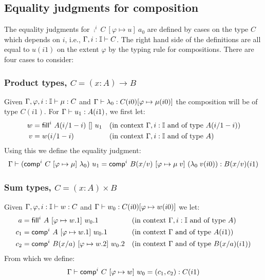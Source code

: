 \subsection{Equality judgments for composition}\label{sec:composition}

The equality judgments for $\comp^i~C~[ \varphi \mapsto u ]~a_0$ are
defined by cases on the type $C$ which depends on $i$, i.e., $\Gamma,
i : \mathbb{I} \vdash C$. The right hand side of the definitions are all equal
to $u(i1)$ on the extent $\varphi$ by the typing rule for
compositions. There are four cases to consider:

\subsubsection*{Product types, $C = (x : A) \rightarrow B$}

Given $\Gamma, \varphi,i : \mathbb{I} \vdash \mu : C$ and $\Gamma \vdash
\lambda_0 : C(i0)[ \varphi \mapsto \mu(i0) ]$ the composition will be
of type $C(i1)$.  For $\Gamma \vdash u_1 : A(i1)$, we first let:
%
\begin{align*}
  w &= \Comp^i~A\subst{i}{1-i}~[]~u_1 %
  && (\text{in context }\Gamma, i : \II\text{ and of type
  }A\subst{i}{1-i}) \\
  v &= w\subst{i}{1-i} %
  && (\text{in context }\Gamma, i : \II\text{ and of type }A)
\end{align*}
%
Using this we define the equality judgment:
\[
  \Gamma \der (\comp^i~C~[ \varphi \mapsto \mu ]~\lambda_0)~u_1 = %
  \comp^i~B \subst{x}{v}~[ \varphi \mapsto \mu \; v]~(\lambda_0 \;
  v(i0)) : B\subst x v (i1)
\]

\subsubsection*{Sum types, $C = (x : A) \times B$}

Given $\Gamma, \varphi, i : \mathbb{I} \vdash w : C$ and $\Gamma \vdash w_0 :
C(i0)[ \varphi \mapsto w(i0) ]$ we let:
%
\begin{align*}
  a &= \Comp^i~A~[ \varphi \mapsto w.1]~w_0.1 %
  && (\text{in context }\Gamma, i : \II\text{ and of type }A)\\
  c_1 &= \comp^i~A~[ \varphi \mapsto w.1]~w_0.1 %
  && (\text{in context }\Gamma\text{ and of type }A(i1))\\
  c_2 &= \comp^i~B\subst{x}{a}~[\varphi \mapsto w.2]~w_0.2%
  && (\text{in context }\Gamma\text{ and of type }B\subst{x}{a}(i1))
\end{align*}
%
From which we define:
%
\[
\Gamma \vdash {\sf comp}^i~C~[ \varphi \mapsto w]~w_0 = (c_1,c_2) : C(i1)
\]

